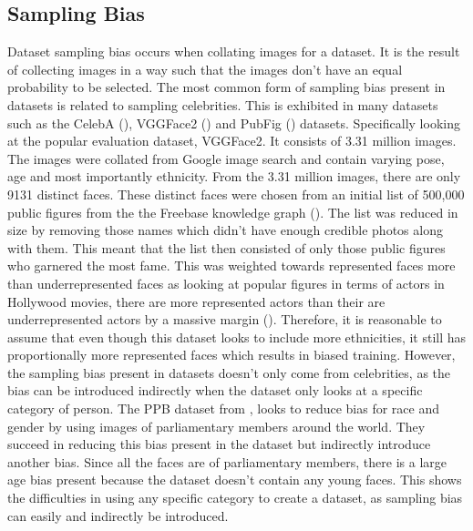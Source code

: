 \documentclass{l4proj}
\begin{document}
\subsection{Sampling Bias}
Dataset sampling bias occurs when collating images for a dataset. It is the result of collecting images in a way such that the images don't have an equal probability to be selected. The most common form of sampling bias present in datasets is related to sampling celebrities. This is exhibited in many datasets such as the CelebA (\cite{celeba}), VGGFace2 (\cite{vggface2}) and PubFig (\cite{pubfig}) datasets. Specifically looking at the popular evaluation dataset, VGGFace2. It consists of 3.31 million images. The images were collated from Google image search and contain varying pose, age and most importantly ethnicity. From the 3.31 million images, there are only 9131 distinct faces. These distinct faces were chosen from an initial list of 500,000 public figures from the the Freebase knowledge graph (\cite{freebase}). The list was reduced in size by removing those names which didn't have enough credible photos along with them. This meant that the list then consisted of only those public figures who garnered the most fame. This was weighted towards represented faces more than underrepresented faces as looking at popular figures in terms of actors in Hollywood movies, there are more represented actors than their are underrepresented actors by a massive margin (\cite{hollywoo}). Therefore, it is reasonable to assume that even though this dataset looks to include more ethnicities, it still has proportionally more represented faces which results in biased training. However, the sampling bias present in datasets doesn't only come from celebrities, as the bias can be introduced indirectly when the dataset only looks at a specific category of person. The PPB dataset from \cite{gendershades}, looks to reduce bias for race and gender by using images of parliamentary members around the world. They succeed in reducing this bias present in the dataset but indirectly introduce another bias. Since all the faces are of parliamentary members, there is a large age bias present because the dataset doesn't contain any young faces. This shows the difficulties in using any specific category to  create a dataset, as sampling bias can easily and indirectly be introduced. 
\end{document}

